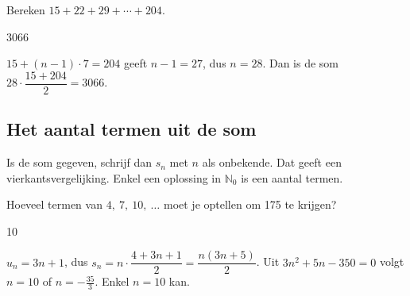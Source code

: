 
\begin{oefeningen}
\begin{oefening}
Bereken $15 + 22 + 29 + \cdots + 204$.
\begin{solution}
3066
\end{solution}
\begin{fullsolution}
$15+(n-1)\cdot 7=204$ geeft $n-1=27$, dus $n=28$. Dan is de som $28\cdot\dfrac{15+204}{2}=3066$.
\end{fullsolution}
\end{oefening}
\end{oefeningen}

\subsection{Het aantal termen uit de som}

\begin{werkwijze}
Is de som gegeven, schrijf dan $s_n$ met $n$ als onbekende. Dat geeft een vierkantsvergelijking. Enkel een oplossing in $\mathbb{N}_0$ is een aantal termen.
\end{werkwijze}



\begin{oefeningen}
\begin{oefening}
Hoeveel termen van $4,\ 7,\ 10,\ \ldots$ moet je optellen om 175 te krijgen?
\begin{solution}
10
\end{solution}
\begin{fullsolution}
$u_n=3n+1$, dus $s_n=n\cdot\dfrac{4+3n+1}{2}=\dfrac{n(3n+5)}{2}$. Uit $3n^2+5n-350=0$ volgt $n=10$ of $n=-\tfrac{35}{3}$. Enkel $n=10$ kan.
\end{fullsolution}
\end{oefening}
\end{oefeningen}

